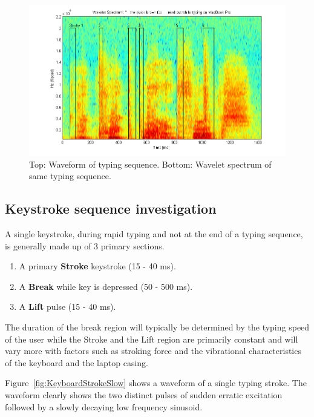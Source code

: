\DIFaddend \begin{figure}[!] %
\centering
\includegraphics[width=150mm]{waveletspectrumAno.png}
\caption{Top: Waveform of typing sequence. Bottom: Wavelet spectrum of same typing sequence.}\label{fig:waveletspectrumAno}
\end{figure}

\subsection{Keystroke sequence investigation}
A single keystroke, during rapid typing and not at the end of a typing sequence, is generally made up of 3 primary sections.
\begin{enumerate}
  \item A primary \textbf{Stroke} keystroke (15 - 40 ms).
  \item A \textbf{Break} while key is depressed (50 - 500 ms).
  \item A \textbf{Lift} pulse (15 - 40 ms).
\end{enumerate}
The duration of the break region will typically be determined by the typing speed of the user while the Stroke and the Lift region are primarily constant and will vary more with factors such as stroking force and the vibrational characteristics of the keyboard and the laptop casing.

Figure~\ref{fig:KeyboardStrokeSlow} shows a waveform of a single typing stroke. The waveform clearly shows the two distinct pulses of sudden erratic excitation followed by a slowly decaying low frequency sinusoid.

